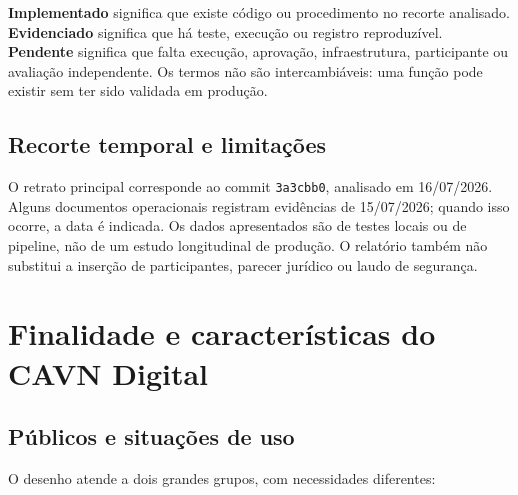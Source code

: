 \documentclass[11pt,a4paper]{article}
\newcommand{\code}[1]{\texttt{#1}}
\begin{document}
\begin{evidencebox}[title=Como as afirmações foram classificadas]
\textbf{Implementado} significa que existe código ou procedimento no recorte analisado. \textbf{Evidenciado} significa que há teste, execução ou registro reproduzível. \textbf{Pendente} significa que falta execução, aprovação, infraestrutura, participante ou avaliação independente. Os termos não são intercambiáveis: uma função pode existir sem ter sido validada em produção.
\end{evidencebox}

\subsection{Recorte temporal e limitações}

O retrato principal corresponde ao commit \code{3a3cbb0}, analisado em 16/07/2026. Alguns documentos operacionais registram evidências de 15/07/2026; quando isso ocorre, a data é indicada. Os dados apresentados são de testes locais ou de pipeline, não de um estudo longitudinal de produção. O relatório também não substitui a inserção de participantes, parecer jurídico ou laudo de segurança.

\section{Finalidade e características do CAVN Digital}

\subsection{Públicos e situações de uso}

O desenho atende a dois grandes grupos, com necessidades diferentes:
\end{document}
